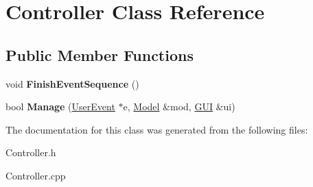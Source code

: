 \hypertarget{classController}{}\section{Controller Class Reference}
\label{classController}
\subsection*{Public Member Functions}
\begin{DoxyCompactItemize}
\item 
\mbox{\label{classController_a7dbaa458c5c4a836a697c54fb4d34508}} 
void {\bfseries Finish\+Event\+Sequence} ()
\item 
\mbox{\label{classController_a4c94bfb506699fea0583f7c92b084399}} 
bool {\bfseries Manage} (\hyperlink{classUserEvent}{User\+Event} $\ast$e, \hyperlink{classModel}{Model} \&mod, \hyperlink{classGUI}{G\+UI} \&ui)
\end{DoxyCompactItemize}


The documentation for this class was generated from the following files\+:\begin{DoxyCompactItemize}
\item 
Controller.\+h\item 
Controller.\+cpp\end{DoxyCompactItemize}
